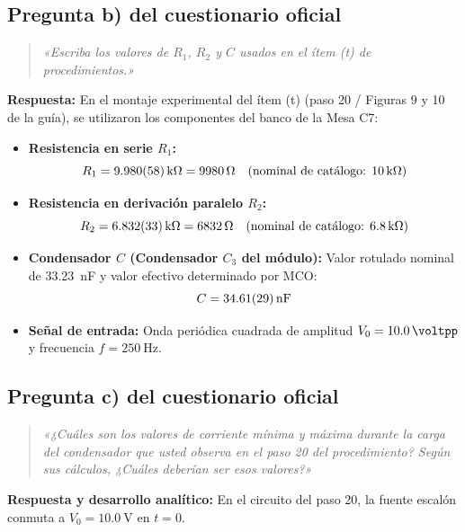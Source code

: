 \begin{appendices}
\subsection{Pregunta b) del cuestionario oficial}
\begin{quote}
    \textit{«Escriba los valores de $R_1$, $R_2$ y $C$ usados en el ítem (t) de procedimientos.»}
\end{quote}

\textbf{Respuesta:} En el montaje experimental del ítem (t) (paso 20 / Figuras 9 y 10 de la guía), se utilizaron los componentes del banco de la Mesa C7:
\begin{itemize}
    \item \textbf{Resistencia en serie $R_1$:}
    \begin{equation*}
        R_1 = \qty{9,980 \pm 0,058}{\kilo\ohm} = \qty{9980}{\ohm} \quad (\text{nominal de catálogo: } \qty{10}{\kilo\ohm})
    \end{equation*}
    \item \textbf{Resistencia en derivación paralelo $R_2$:}
    \begin{equation*}
        R_2 = \qty{6,832 \pm 0,033}{\kilo\ohm} = \qty{6832}{\ohm} \quad (\text{nominal de catálogo: } \qty{6,8}{\kilo\ohm})
    \end{equation*}
    \item \textbf{Condensador $C$ (Condensador $C_3$ del módulo):} Valor rotulado nominal de \qty{33,23}{\nano\farad} y valor efectivo determinado por MCO:
    \begin{equation*}
        C = \qty{34,61 \pm 0,29}{\nano\farad}
    \end{equation*}
    \item \textbf{Señal de entrada:} Onda periódica cuadrada de amplitud $V_0 = \qty{10,0}{\voltpp}$ y frecuencia $f = \qty{250}{\hertz}$.
\end{itemize}

\subsection{Pregunta c) del cuestionario oficial}
\begin{quote}
    \textit{«¿Cuáles son los valores de corriente mínima y máxima durante la carga del condensador que usted observa en el paso 20 del procedimiento? Según sus cálculos, ¿Cuáles deberían ser esos valores?»}
\end{quote}

\textbf{Respuesta y desarrollo analítico:}
En el circuito del paso 20, la fuente escalón conmuta a $V_0 = \qty{10,0}{\volt}$ en $t = 0$.


\end{appendices}
